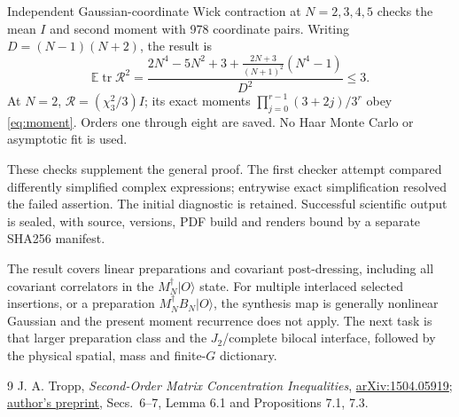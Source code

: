 \documentclass[11pt]{article}
\newcommand{\E}{\mathbb E}
\newcommand{\tr}{\operatorname{tr}}
\begin{document}
Independent Gaussian-coordinate Wick contraction at $N=2,3,4,5$
checks the mean $I$ and second moment with 978 coordinate pairs.
Writing $D=(N-1)(N+2)$, the result is
\begin{equation}
 \E\tr\mathcal R^2=
 \frac{2N^4-5N^2+3+\frac{2N+3}{(N+1)^2}(N^4-1)}{D^2}\le3.
\end{equation}
At $N=2$, $\mathcal R=(\chi_3^2/3)I$; its exact moments
$\prod_{j=0}^{r-1}(3+2j)/3^r$ obey \eqref{eq:moment}. Orders one
through eight are saved. No Haar Monte Carlo or asymptotic fit is used.

These checks supplement the general proof. The first checker attempt
compared differently simplified complex expressions; entrywise exact
simplification resolved the failed assertion. The initial diagnostic
is retained. Successful scientific output is sealed, with source,
versions, PDF build and renders bound by a separate SHA256 manifest.

The result covers linear preparations and covariant post-dressing,
including all covariant correlators in the $M_N^\dagger|O\rangle$
state. For multiple interlaced selected insertions, or a preparation
$M_N^\dagger B_N|O\rangle$, the synthesis map is generally nonlinear
Gaussian and the present moment recurrence does not apply.
The next task is that larger preparation class and the $J_2$/complete
bilocal interface, followed by the physical spatial, mass and
finite-$G$ dictionary.

\begin{thebibliography}{9}\small
{} J. A. Tropp, \emph{Second-Order Matrix Concentration Inequalities},
\href{https://arxiv.org/abs/1504.05919}{arXiv:1504.05919};
\href{https://tropp.caltech.edu/papers/Tro16-Second-Order-Matrix-preprint.pdf}{author's preprint},
Secs.~6--7, Lemma 6.1 and Propositions 7.1, 7.3.
\end{thebibliography}
\end{document}
